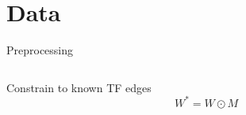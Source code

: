 \section{Data}





% 


\begin{frame}{Preprocessing}
\label{sec:data_preprocess}
\begin{columns}
\begin{column}{0.5\textwidth}


Constrain to known TF edges
\begin{equation}     W^* = W \odot M
\end{equation}


\end{column}
\end{columns}
\end{frame}
